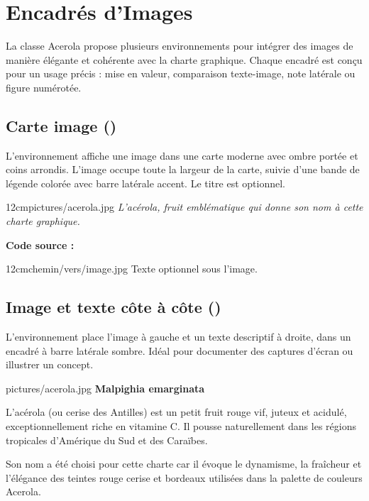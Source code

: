 \documentclass[theme=acerola]{myrtille}
\begin{document}
\section{Encadrés d'Images}

La classe Acerola propose plusieurs environnements pour intégrer des images de manière élégante et cohérente avec la charte graphique. Chaque encadré est conçu pour un usage précis : mise en valeur, comparaison texte-image, note latérale ou figure numérotée.

\subsection{Carte image ()}

L'environnement  affiche une image dans une carte moderne avec ombre portée et coins arrondis. L'image occupe toute la largeur de la carte, suivie d'une bande de légende colorée avec barre latérale accent. Le titre est optionnel.

\begin{imgbox}{12cm}{pictures/acerola.jpg}
  \footnotesize\color{mid}\textit{L'acérola, fruit emblématique qui donne son nom à cette charte graphique.}
\end{imgbox}

\textbf{Code source :}
\begin{texblock}
\begin{imgbox}{12cm}{chemin/vers/image.jpg} %
  Texte optionnel sous l'image.
\end{imgbox}
\end{texblock}

\subsection{Image et texte côte à côte ()}

L'environnement  place l'image à gauche et un texte descriptif à droite, dans un encadré à barre latérale sombre. Idéal pour documenter des captures d'écran ou illustrer un concept.

\begin{imgfloat}{pictures/acerola.jpg}
  \textbf{Malpighia emarginata}

  L'acérola (ou cerise des Antilles) est un petit fruit rouge vif, juteux et acidulé, exceptionnellement riche en vitamine C. Il pousse naturellement dans les régions tropicales d'Amérique du Sud et des Caraïbes.

  \vspace{4pt}
  Son nom a été choisi pour cette charte car il évoque le dynamisme, la fraîcheur et l'élégance des teintes rouge cerise et bordeaux utilisées dans la palette de couleurs Acerola.
\end{imgfloat}
\end{document}
